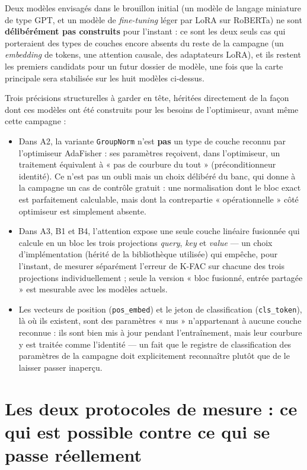 \documentclass[11pt,a4paper]{article}
\newcommand{\eng}[1]{\emph{#1}}
\begin{document}
Deux modèles envisagés dans le brouillon initial (un modèle de langage miniature de type GPT, et un
modèle de \eng{fine-tuning} léger par LoRA sur RoBERTa) ne sont \textbf{délibérément pas construits}
pour l'instant : ce sont les deux seuls cas qui porteraient des types de couches encore absents du
reste de la campagne (un \eng{embedding} de tokens, une attention causale, des adaptateurs LoRA), et
ils restent les premiers candidats pour un futur dossier de modèle, une fois que la carte principale
sera stabilisée sur les huit modèles ci-dessus.

Trois précisions structurelles à garder en tête, héritées directement de la façon dont ces modèles
ont été construits pour les besoins de l'optimiseur, avant même cette campagne :
\begin{itemize}
\item Dans A2, la variante \texttt{GroupNorm} n'est \textbf{pas} un type de couche reconnu par
l'optimiseur AdaFisher : ses paramètres reçoivent, dans l'optimiseur, un traitement équivalent à
« pas de courbure du tout » (préconditionneur identité). Ce n'est pas un oubli mais un choix
délibéré du banc, qui donne à la campagne un cas de contrôle gratuit : une normalisation dont le
bloc exact est parfaitement calculable, mais dont la contrepartie « opérationnelle » côté optimiseur
est simplement absente.
\item Dans A3, B1 et B4, l'attention expose une seule couche linéaire fusionnée qui calcule en un
bloc les trois projections \eng{query}, \eng{key} et \eng{value} — un choix d'implémentation
(hérité de la bibliothèque utilisée) qui empêche, pour l'instant, de mesurer séparément l'erreur de
K-FAC sur chacune des trois projections individuellement ; seule la version « bloc fusionné, entrée
partagée » est mesurable avec les modèles actuels.
\item Les vecteurs de position (\texttt{pos\_embed}) et le jeton de classification
(\texttt{cls\_token}), là où ils existent, sont des paramètres « nus » n'appartenant à aucune couche
reconnue : ils sont bien mis à jour pendant l'entraînement, mais leur courbure y est traitée comme
l'identité — un fait que le registre de classification des paramètres de la campagne doit
explicitement reconnaître plutôt que de le laisser passer inaperçu.
\end{itemize}

\section{Les deux protocoles de mesure : ce qui est possible contre ce qui se passe réellement}
\label{sec:protocoles}
\end{document}
